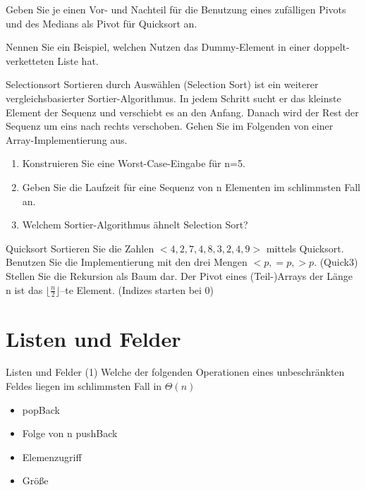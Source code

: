 \documentclass[18pt]{beamer}
\begin{document}
\begin{frame}
 Geben Sie je einen Vor- und Nachteil für die Benutzung eines zufälligen Pivots und des Medians als Pivot für Quicksort an.
\end{frame}

\begin{frame}
 Nennen Sie ein Beispiel, welchen Nutzen das Dummy-Element in einer doppelt-verketteten Liste hat.
\end{frame}

\begin{frame}{Selectionsort}
 Sortieren durch Auswählen (Selection Sort) ist ein weiterer vergleichsbasierter Sortier-Algorithmus. In jedem Schritt sucht er das kleinste Element der Sequenz und verschiebt es an den Anfang. Danach wird der Rest der Sequenz um eins nach rechts verschoben. Gehen Sie im Folgenden von einer Array-Implementierung aus.
 \begin{enumerate}[label=\alph* )]
  \item Konstruieren Sie eine Worst-Case-Eingabe für n=5.
  \item Geben Sie die Laufzeit für eine Sequenz von n Elementen im schlimmsten Fall an.
  \item Welchem Sortier-Algorithmus ähnelt Selection Sort?
 \end{enumerate}
\end{frame}

\begin{frame}{Quicksort}
Sortieren Sie die Zahlen $<4,2,7,4,8,3,2,4,9>$ mittels Quicksort. 
Benutzen Sie die Implementierung mit den drei Mengen $<p, =p, >p$. (Quick3) 
Stellen Sie die Rekursion als Baum dar. Der Pivot eines 
(Teil-)Arrays der Länge n ist das $\lfloor \frac{n}{2} \rfloor$–te Element. (Indizes starten bei 0)
\end{frame}


\section{Listen und Felder}
\begin{frame}{Listen und Felder (1)}
 Welche der folgenden Operationen eines unbeschränkten Feldes 
 liegen im schlimmsten Fall in $\Theta(n)$
 \begin{itemize}
  \item popBack
  \item Folge von n pushBack
  \item Elemenzugriff
  \item Größe
 \end{itemize}
\end{frame}
\end{document}
